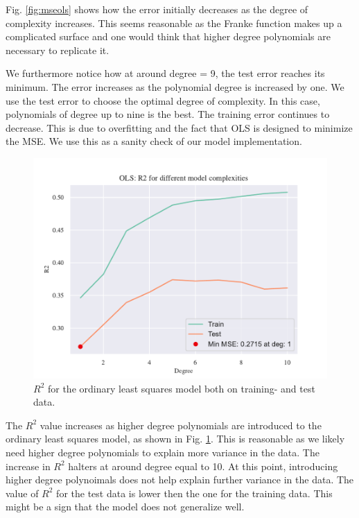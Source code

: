 
Fig. \ref{fig:mseols} shows how the error initially decreases as the degree of complexity increases. This seems reasonable as the Franke function makes up a complicated surface and one would think that higher degree polynomials are necessary to replicate it. 

We furthermore notice how at around degree = 9, the test error reaches its minimum. The error increases as the polynomial degree is increased by one. We use the test error to choose the optimal degree of complexity. In this case, polynomials of degree up to nine is the best. The training error continues to decrease. This is due to overfitting and the fact that OLS is designed to minimize the MSE. We use this as a sanity check of our model implementation.

\begin{figure}[h!]
    \centering
    \includegraphics[width=1\linewidth]{project_1_alt/figures/figures_in_report/OLS_R2_Franke_Noise.pdf}
    \caption{$R^2$ for the ordinary least squares model both on training- and test data.}
    \label{fig:r2ols}
\end{figure}

The $R^2$ value increases as higher degree polynomials are introduced to the ordinary least squares model, as shown in Fig. \ref{fig:r2ols}. This is reasonable as we likely need higher degree polynomials to explain more variance in the data. The increase in $R^2$ halters at around degree equal to 10. At this point, introducing higher degree polynoimals does not help explain further variance in the data. The value of $R^2$ for the test data is lower then the one for the training data. This might be a sign that the model does not generalize well. 

